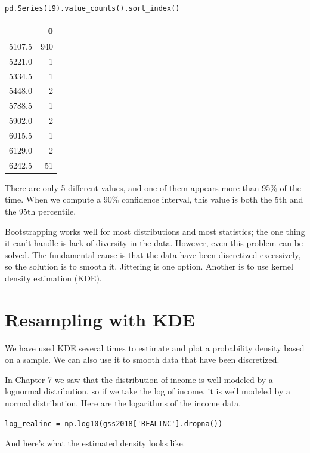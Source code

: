 \begin{lstlisting}[]
pd.Series(t9).value_counts().sort_index()
\end{lstlisting}

\begin{tabular}{lr}
\midrule
{} &    0 \\
\midrule
5107.5 &  940 \\
5221.0 &    1 \\
5334.5 &    1 \\
5448.0 &    2 \\
5788.5 &    1 \\
5902.0 &    2 \\
6015.5 &    1 \\
6129.0 &    2 \\
6242.5 &   51 \\
\midrule
\end{tabular}

There are only 5 different values, and one of them appears more than
95\% of the time. When we compute a 90\% confidence interval, this value
is both the 5th and the 95th percentile.

Bootstrapping works well for most distributions and most statistics; the
one thing it can't handle is lack of diversity in the data. However,
even this problem can be solved. The fundamental cause is that the data
have been discretized excessively, so the solution is to smooth it.
Jittering is one option. Another is to use kernel density estimation
(KDE).

\hypertarget{resampling-with-kde}{%
\section{Resampling with KDE}\label{resampling-with-kde}}

We have used KDE several times to estimate and plot a probability
density based on a sample. We can also use it to smooth data that have
been discretized.

In Chapter 7 we saw that the distribution of income is well modeled by a
lognormal distribution, so if we take the log of income, it is well
modeled by a normal distribution. Here are the logarithms of the income
data.

\begin{lstlisting}[]
log_realinc = np.log10(gss2018['REALINC'].dropna())
\end{lstlisting}

And here's what the estimated density looks like.

